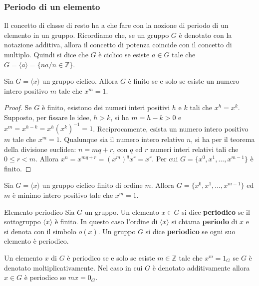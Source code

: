 \subsubsection{Periodo di un elemento}
Il concetto di classe di resto ha a che fare con la nozione di periodo di un elemento in un gruppo. Ricordiamo che, se un gruppo $G$ è denotato con la notazione additiva, allora il concetto di potenza coincide con il concetto di multiplo. Quindi si dice che $G$ è ciclico se esiste $a \in G$ tale che $G=\langle a \rangle = \{na / n \in \mathbb{Z}\}$.

\begin{lemmabox}
	Sia $G=\langle x \rangle$ un gruppo ciclico. Allora $G$ è finito se e solo se esiste un numero intero positivo $m$ tale che $x^{m}=1$.
\end{lemmabox}

\begin{proof}
	Se $G$ è finito, esistono dei numeri interi positivi $h$ e $k$ tali che $x^{h}=x^{k}$. Supposto, per fissare le idee, $h>k$, si ha $m=h-k>0$ e $x^{m}=x^{h-k}=x^{h}(x^{k})^{-1}=1$. Reciprocamente, esista un numero intero positivo $m$ tale che $x^{m}=1$. Qualunque sia il numero intero relativo $n$, si ha per il teorema della divisione euclidea: $n=mq+r$, con $q$ ed $r$ numeri interi relativi tali che $0\leq r < m$. Allora $x^{n}= x^{mq+r}=(x^{m})^{q}x^{r}=x^{r}$. Per cui $G=\{x^{0},x^{1},\ldots,x^{m-1}\}$ è finito.
\end{proof}


\begin{teorbox}
	Sia $G=\langle x \rangle$ un gruppo ciclico finito di ordine $m$. Allora $G=\{x^{0},x^{1},\ldots,x^{m-1}\}$ ed $m$ è minimo intero positivo tale che $x^{m}=1$.
\end{teorbox}

\begin{defbox}{Elemento periodico}
	Sia $G$ un gruppo. Un elemento $x \in G$ si dice \textbf{periodico} se il sottogruppo $\langle x \rangle$ è finito. In questo caso l'ordine di $\langle x \rangle$ si chiama \textbf{periodo} di $x$ e si denota con il simbolo $o(x)$. Un gruppo $G$ si dice \textbf{periodico} se ogni suo elemento è periodico.
\end{defbox}

\begin{osservation}
	Un elemento $x$ di $G$ è periodico se e solo se esiste $m \in \mathbb{Z}$ tale che $x^{m}=1_{G}$ se $G$ è denotato moltiplicativamente. Nel caso in cui $G$ è denotato additivamente allora $x \in G$ è periodico se $mx = 0_{G}$.
\end{osservation}

